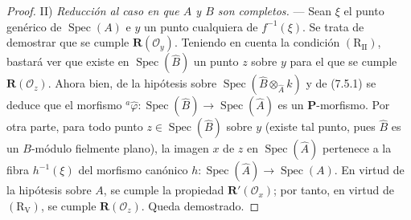 \begin{proof}
II) \emph{Reducción al caso en que $A$ y $B$ son completos.} --- Sean
$\xi$ el punto genérico de $\operatorname{Spec}(A)$ e $y$ un punto
cualquiera de $f^{-1}(\xi)$. Se trata de demostrar que se cumple
$\boldsymbol R(\mathscr O_y)$. Teniendo en cuenta la condición
$(\mathrm R_{\mathrm{II}})$, bastará ver que existe en
$\operatorname{Spec}(\widehat B)$ un punto $z$ sobre $y$ para el que
se cumple $\boldsymbol R(\mathscr O_z)$. Ahora bien, de la hipótesis
sobre $\operatorname{Spec}(\widehat B\otimes_{\widehat A}k)$ y de
(7.5.1) se deduce que el morfismo
${}^a\widehat\varphi:\operatorname{Spec}(\widehat B)
\to\operatorname{Spec}(\widehat A)$
es un $\boldsymbol P$-morfismo. Por otra parte, para todo punto
$z\in\operatorname{Spec}(\widehat B)$ sobre $y$ (existe tal punto,
pues $\widehat B$ es un $B$-módulo fielmente plano), la imagen $x$ de
$z$ en $\operatorname{Spec}(\widehat A)$ pertenece a la fibra
$h^{-1}(\xi)$ del morfismo canónico
$h:\operatorname{Spec}(\widehat A)\to\operatorname{Spec}(A)$. En
virtud de la hipótesis sobre $A$, se cumple la propiedad
$\boldsymbol R'(\mathscr O_x)$; por tanto, en virtud de
$(\mathrm R_{\mathrm V})$, se cumple $\boldsymbol R(\mathscr O_z)$.
Queda demostrado.
\end{proof}
